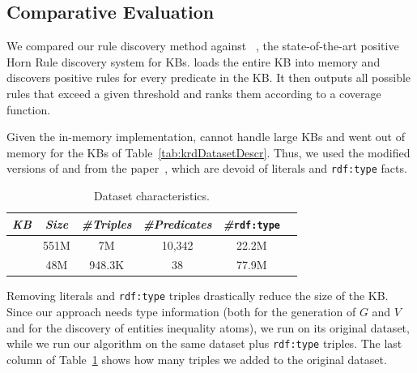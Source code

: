 \subsection{Comparative Evaluation} \label{sec:krd_comparative}
We compared our rule discovery method against \amie~\cite{galarraga2015fast}, the state-of-the-art positive Horn Rule discovery system for KBs.
%
\amie  loads the entire KB into memory and discovers positive rules for every predicate in the KB. 
It then outputs all possible rules that exceed a given threshold and ranks them according to a coverage function.

Given the in-memory implementation, \amie cannot handle large KBs and went out of memory for the KBs of Table~\ref{tab:krdDatasetDescr}. Thus, we used the modified versions of \yago and \dbpedia from the \amie paper~\cite{galarraga2015fast}, which are devoid of literals and \texttt{rdf:type} facts.
\begin{table}[htb]
\vspace{-3ex}
	\centering
	\caption{\amie Dataset characteristics.}
	\label{tab:AmieDatasetDescr}
	\begin{small}
		\begin{tabular}{|c|c|c|c|c|c|}
			\hline
			\hline
			{\it KB}&{\it Size}&{\it  \#Triples}&{\it \#Predicates}&{\it \#}\texttt{rdf:type}\tabularnewline
			\hline
			\dbpedia & 551M & 7M & 10,342 & 22.2M \tabularnewline
			\yago & 48M & 948.3K & 38 & 77.9M  \tabularnewline
			\hline
		\end{tabular}
	\end{small}
\end{table}

Removing literals and \texttt{rdf:type} triples drastically reduce the size of the KB. Since our approach needs type information (both for the generation of $G$ and $V$ and for the discovery of entities inequality atoms), we run \amie on its original dataset, while we run our algorithm on the same dataset plus \texttt{rdf:type} triples. The last column of Table~\ref{tab:AmieDatasetDescr} shows how many triples we added to the original \amie dataset.

